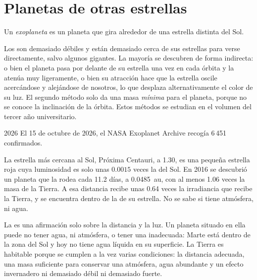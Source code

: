 \section{Planetas de otras estrellas}

\begin{definition}[Exoplaneta]\label{def:g10:habitable-planet:exoplanet}
Un \emph{exoplaneta} es un planeta que gira alrededor de
una estrella distinta del Sol.
\end{definition}

Los  son demasiado débiles y están demasiado cerca de sus
estrellas para verse directamente, salvo algunos gigantes. La mayoría se
descubren de forma indirecta: o bien el planeta pasa por delante de su
estrella una vez en cada órbita y la atenúa muy ligeramente, o bien su
atracción hace que la estrella oscile acercándose y alejándose de nosotros,
lo que desplaza alternativamente el color de su luz. El segundo método solo
da una masa \emph{mínima} para el planeta, porque no se conoce la
inclinación de la órbita. Estos métodos se estudian en el volumen del
tercer año universitario.

\begin{dated}{2026}
El 15 de octubre de 2026, el NASA Exoplanet Archive recogía 6\,451
 confirmados.
\end{dated}

\begin{example}[Próxima b]\label{ex:g10:habitable-planet:proxima}
La estrella más cercana al Sol, Próxima Centauri, a \qty{1.30}{\parsec}, es
una pequeña estrella roja cuya luminosidad es solo unas $0.0015$ veces la del
Sol. En 2016 se descubrió un planeta que la rodea cada 11.2 días, a
\qty{0.0485}{au}, con al menos 1.06 veces la masa de la Tierra. A esa
distancia recibe unas 0.64 veces la irradiancia que recibe la Tierra, y se
encuentra dentro de la  de su estrella. No se sabe si tiene
atmósfera, ni agua.
\end{example}

\begin{remark}\label{rem:g10:habitable-planet:inhabited}
La  es una afirmación solo sobre la distancia y la luz. Un
planeta situado en ella puede no tener agua, ni atmósfera, o tener una
inadecuada: Marte está dentro de la zona del Sol y hoy no tiene agua líquida
en su superficie. La Tierra es habitable porque se cumplen a la vez varias
condiciones: la distancia adecuada, una masa suficiente para conservar una
atmósfera, agua abundante y un efecto invernadero ni demasiado débil ni
demasiado fuerte.
\end{remark}

